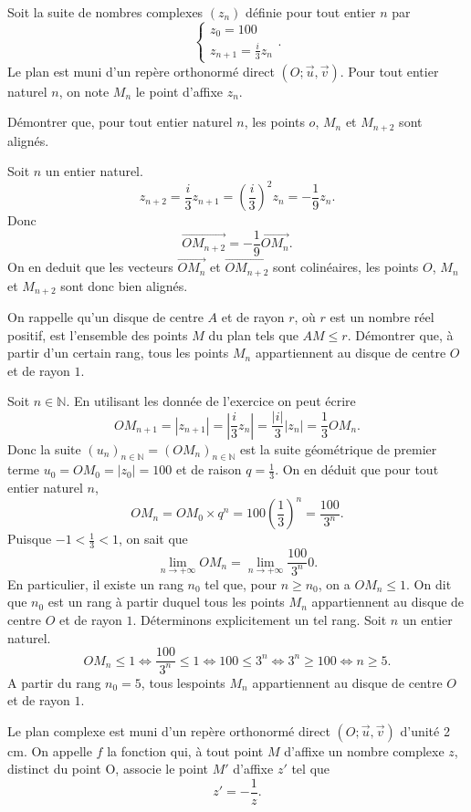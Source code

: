 \documentclass[a4paper,11pt]{article} %
\numberwithin{equation}{section} %
\numberwithin{figure}{section} %
\theoremstyle{plain} %
\theoremstyle{definition} %
\theoremstyle{remark} %
\begin{document}

Soit la suite de nombres complexes $(z_n)$ définie pour tout entier $n$ par 
$$
\left\{
\begin{array}{l}
z_0 = 100\\
z_{n+1} = \frac{i}{3} z_{n} 
\end{array}
\right. .
$$
Le plan est muni d’un repère orthonormé direct $\left(O;\vec{u},\vec{v}\right)$. Pour tout entier naturel $n$, on note $M_n$ le point d’affixe $z_n$. 


Démontrer que, pour tout entier naturel $n$, les points $o$, $M_n$ et $M_{n+2}$ sont alignés.


Soit $n$ un entier naturel. $$z_{n+2} = \frac{i}{3} z_{n+1} = \left(\frac{i}{3}\right)^2 z_{n} = -\frac{1}{9} z_n.$$ Donc $$\vec{OM_{n+2}} = -\frac{1}{9} \vec{OM_n}.$$ On en deduit que les vecteurs $\vec{OM_n}$ et $\vec{OM_{n+2}}$ sont colinéaires, les points $O$, $M_n$ et $M_{n+2}$ sont donc bien alignés.


On rappelle qu’un disque de centre $A$ et de rayon $r$, où $r$ est un nombre réel positif, est l’ensemble des points $M$ du plan tels que $AM \leq r$. Démontrer que, à partir d’un certain rang, tous les points $M_n$ appartiennent au disque de centre $O$ et de rayon $1$.


Soit $n \in \mathbb{N}$. En utilisant les donnée de l'exercice on peut écrire $$OM_{n+1} = \left| z_{n+1} \right| = \left| \frac{i}{3} z_{n} \right| = \frac{\left| i \right|}{3} \left| z_n \right| = \frac13 OM_n.$$ Donc la suite $(u_n)_{n\in\mathbb{N}} = (OM_n)_{n\in\mathbb{N}}$ est la suite géométrique de premier terme $u_0 = OM_0 = \left|z_0\right| = 100$ et de raison $q=\frac13$. On en déduit que pour tout entier naturel $n$, $$OM_n = OM_0 \times q^n = 100 \left( \frac13 \right)^n = \frac{100}{3^n}.$$ Puisque $-1 < \frac13 < 1$, on sait que $$\lim_{n \to +\infty} OM_n = \lim_{n \to +\infty} \frac{100}{3^n} 0.$$ En particulier, il existe un rang $n_0$ tel que, pour $n \geq n_0$, on a $OM_n \leq 1$. On dit que $n_0$ est un rang à partir duquel tous les points $M_n$ appartiennent au disque de centre $O$ et de rayon $1$. Déterminons explicitement un tel rang. Soit $n$ un entier naturel. $$OM_n \leq 1 \Leftrightarrow \frac{100}{3^n} \leq 1 \Leftrightarrow 100 \leq 3^n \Leftrightarrow 3^n \geq 100 \Leftrightarrow n \geq 5.$$ A partir du rang $n_0 = 5$, tous lespoints $M_n$ appartiennent au disque de centre $O$ et de rayon $1$.




Le plan complexe est muni d'un repère orthonormé direct $\left(O;\vec{u},\vec{v}\right)$ d’unité 2 cm. On appelle $f$ la fonction qui, à tout point $M$ d'affixe un nombre complexe $z$, distinct du point O, associe le point $M'$ d'affixe $z'$ tel que $$z' = - \frac{1}{z}.$$
\end{document}
